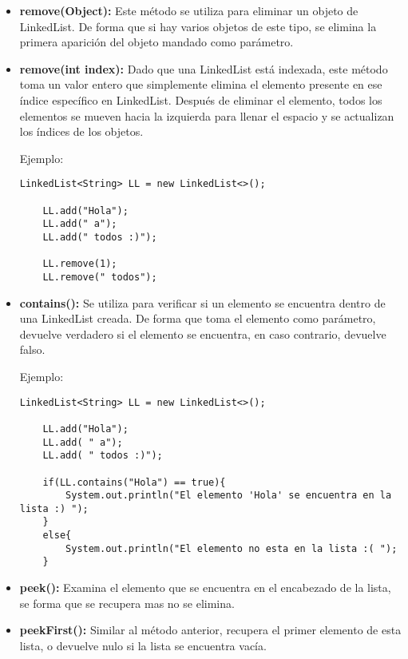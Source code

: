 \documentclass[12pt, letterpaper]{article} %
\begin{document}
\begin{itemize}
    \item \textbf{remove(Object):} Este método se utiliza para eliminar un objeto de LinkedList. De forma que si hay varios objetos de este tipo, se elimina la primera aparición del objeto mandado como parámetro.
    
    \item \textbf{remove(int index):} Dado que una LinkedList está indexada, este método toma un valor entero que simplemente elimina el elemento presente en ese índice específico en LinkedList. Después de eliminar el elemento, todos los elementos se mueven hacia la izquierda para llenar el espacio y se actualizan los índices de los objetos.

    Ejemplo:
    \lstset{language = Java, breaklines=true, basicstyle=\footnotesize}
    \begin{lstlisting}[frame=single]
    LinkedList<String> LL = new LinkedList<>();

    LL.add("Hola");  
    LL.add(" a");
    LL.add(" todos :)");

    LL.remove(1);
    LL.remove(" todos");
    \end{lstlisting}
    
    \item \textbf{contains():} Se utiliza para verificar si un elemento se encuentra dentro de una LinkedList creada. De forma que toma el elemento como parámetro, devuelve verdadero si el elemento se encuentra, en caso contrario, devuelve falso.

    Ejemplo:
    \lstset{language = Java, breaklines=true, basicstyle=\footnotesize}
    \begin{lstlisting}[frame=single]
    LinkedList<String> LL = new LinkedList<>();

    LL.add("Hola");  
    LL.add( " a");
    LL.add( " todos :)");

    if(LL.contains("Hola") == true){
        System.out.println("El elemento 'Hola' se encuentra en la lista :) ");
    }
    else{
    	System.out.println("El elemento no esta en la lista :( ");
    }
    \end{lstlisting}
    
    \item \textbf{peek():} Examina el elemento que se encuentra en el encabezado de la lista, se forma que se recupera mas no se elimina.
    
    \item \textbf{peekFirst():} Similar al método anterior, recupera el primer elemento de esta lista, o devuelve nulo si la lista se encuentra vacía.
    

\end{itemize}
\end{document}
